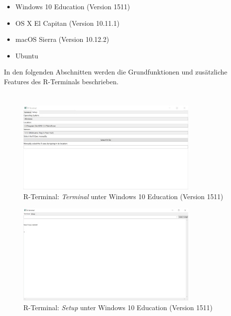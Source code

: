 \documentclass[a4paper, 12pt]{report} %
\begin{document}
\begin{itemize}
\item Windows 10 Education (Version 1511)
\item OS X El Capitan (Version 10.11.1)
\item macOS Sierra (Version 10.12.2)
\item Ubuntu
\end{itemize}


In den folgenden Abschnitten werden die Grundfunktionen und zusätzliche Features des R-Terminals beschrieben. 
\section{}

\begin{figure}[htpb]
\centering
\includegraphics[width=0.8\textwidth]{R-TerminalWindows}
\caption{R-Terminal: \textit{Terminal} unter Windows 10 Education (Version 1511)}
\label{rterminalwindows}
\end{figure}

\begin{figure}[htpb]
\centering
\includegraphics[width=0.8\textwidth]{rterminalwindows}
\caption{R-Terminal: \textit{Setup} unter Windows 10 Education (Version 1511)}
\label{rterminalwindows}
\end{figure}
\end{document}

